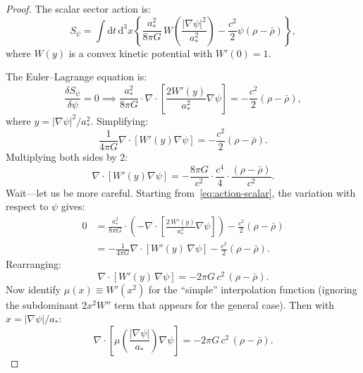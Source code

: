 \documentclass[11pt]{article}
\newcommand{\dd}{\mathrm{d}}
\begin{document}
\begin{proof}
The scalar sector action is:
\begin{equation}
S_\psi = \int \dd t\,\dd^3 x\left\{
\frac{a_*^2}{8\pi G}\,W\!\left(\frac{|\nabla\psi|^2}{a_*^2}\right)
- \frac{c^2}{2}\psi(\rho - \bar\rho)\right\},
\label{eq:action-scalar}
\end{equation}
where $W(y)$ is a convex kinetic potential with $W'(0)=1$.

The Euler--Lagrange equation is:
\begin{equation}
\frac{\delta S_\psi}{\delta\psi} = 0 \implies
\frac{a_*^2}{8\pi G}\cdot\nabla\cdot\left[\frac{2W'(y)}{a_*^2}\nabla\psi\right]
= -\frac{c^2}{2}(\rho - \bar\rho),
\end{equation}
where $y = |\nabla\psi|^2/a_*^2$.  Simplifying:
\begin{equation}
\frac{1}{4\pi G}\nabla\cdot\left[W'(y)\nabla\psi\right] = -\frac{c^2}{2}(\rho-\bar\rho).
\end{equation}
Multiplying both sides by $2$:
\begin{equation}
\nabla\cdot\left[W'(y)\nabla\psi\right] = -\frac{8\pi G}{c^2}\cdot\frac{c^4}{4}\cdot\frac{(\rho-\bar\rho)}{c^2}.
\end{equation}
Wait---let us be more careful.  Starting from~\eqref{eq:action-scalar}, the variation with respect to $\psi$ gives:
\begin{align}
0 &= \frac{a_*^2}{8\pi G}\cdot\left(-\nabla\cdot\left[\frac{2\,W'(y)}{a_*^2}\nabla\psi\right]\right) - \frac{c^2}{2}(\rho - \bar\rho) \nonumber \\
&= -\frac{1}{4\pi G}\nabla\cdot\left[W'(y)\,\nabla\psi\right] - \frac{c^2}{2}(\rho - \bar\rho).
\end{align}
Rearranging:
\begin{equation}
\nabla\cdot\left[W'(y)\,\nabla\psi\right] = -2\pi G\, c^2\,(\rho - \bar\rho).
\end{equation}
Now identify $\mu(x) \equiv W'(x^2)$ for the ``simple'' interpolation function
(ignoring the subdominant $2x^2 W''$ term that appears for the general case).
Then with $x = |\nabla\psi|/a_*$:
\begin{equation}
\nabla\cdot\left[\mu\!\left(\frac{|\nabla\psi|}{a_*}\right)\nabla\psi\right]
= -2\pi G\, c^2\, (\rho - \bar\rho).
\end{equation}


\end{proof}
\end{document}
